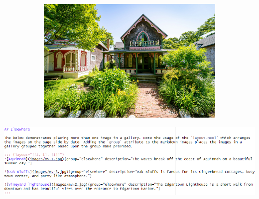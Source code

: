 \documentclass[
  a4paper,
  DIV=11,
  numbers=noendperiod,
  oneside,
  open=any]{scrreprt}
\begin{document}
\begin{figure}
\begin{minipage}{0.50\linewidth}
\begin{figure}[H]
{}


\end{figure}%

\end{minipage}%
\newline
\begin{minipage}{\linewidth}

\begin{figure}[H]

{\centering \includegraphics{images/mv-2.jpg}

}


\end{figure}%

\end{minipage}%

\end{figure}%

\includegraphics{images/_format_lightbox2.png}
\end{document}
